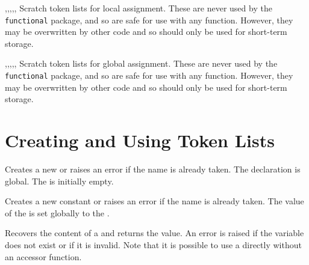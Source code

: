 \documentclass[oneside]{book}
\begin{document}
\begin{variable}{\lTmpaTl,\lTmpbTl,\lTmpcTl,\lTmpiTl,\lTmpjTl,\lTmpkTl}
Scratch token lists for local assignment. These are never used by
the \verb!functional! package, and so are safe for use with any
function. However, they may be overwritten by other
code and so should only be used for short-term storage.
\end{variable}

\begin{variable}{\gTmpaTl,\gTmpbTl,\gTmpcTl,\gTmpiTl,\gTmpjTl,\gTmpkTl}
Scratch token lists for global assignment. These are never used by
the \verb!functional! package, and so are safe for use with any
function. However, they may be overwritten by other
code and so should only be used for short-term storage.
\end{variable}

\section{Creating and Using Token Lists}

\begin{function}{\tlNew}
\begin{syntax}
 
\end{syntax}
Creates a new  or raises an error if the
name is already taken. The declaration is global. The
 is initially empty.
\begin{codehigh}
\tlNew \lFooSomeTl
\end{codehigh}
\end{function}

\begin{function}{\tlConst}
\begin{syntax}
  
\end{syntax}
Creates a new constant  or raises an error
if the name is already taken. The value of the
 is set globally to the .
\begin{codehigh}
\tlConst {}
\end{codehigh}
\end{function}

\begin{function}{\tlUse}
\begin{syntax}
 
\end{syntax}
Recovers the content of a  and returns the value.
An error is raised if the variable
does not exist or if it is invalid. Note that it is possible to use
a  directly without an accessor function.
\begin{codehigh}
\tlUse \lTmpbTl
\end{codehigh}
\end{function}
\end{document}
